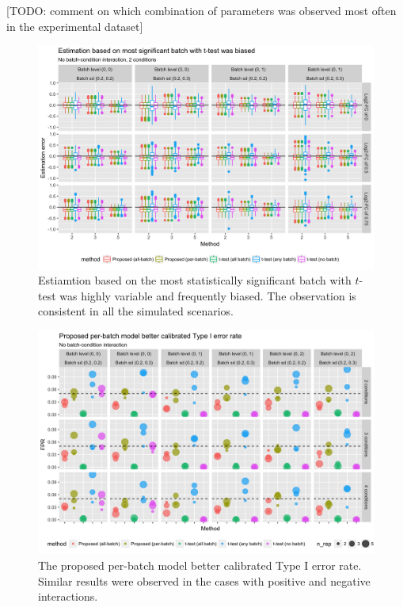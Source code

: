 \documentclass{mcp}
\def\todo#1{{\color{red}[TODO: #1]}}
\begin{document}
\todo{comment on which combination of parameters was observed most often in the experimental dataset}

\begin{figure}[h!]
\centering
\includegraphics[width=.825\textwidth]{sim/synnull_est_2}
\caption{Estiamtion based on the most statistically significant batch with $t$-test was highly variable and frequently biased. The observation is consistent in all the simulated scenarios. \label{fig:synnull_est}}
\end{figure}

\begin{figure}[h!]
\centering
\includegraphics[width=.825\textwidth]{sim/synnull_fpr}
\caption{The proposed per-batch model better calibrated Type I error rate. Similar results were observed in the cases with positive and negative interactions. \label{fig:synnull_fpr}}
\end{figure}
\end{document}
